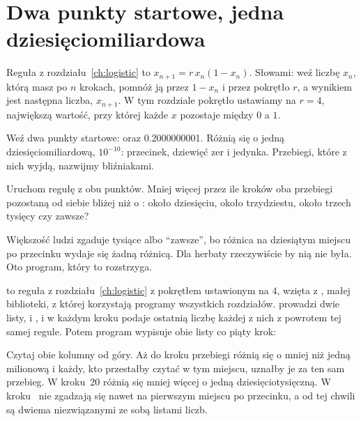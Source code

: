 \section{Dwa punkty startowe, jedna dziesięciomiliardowa}
\label{sec:ch06-twins}

\noindent
Reguła z rozdziału~\ref{ch:logistic} to $x_{n+1} = r\,x_n(1 - x_n)$.
Słowami: weź liczbę $x_n$, którą masz po $n$ krokach, pomnóż ją przez
$1 - x_n$ i przez pokrętło $r$, a wynikiem jest następna liczba, $x_{n+1}$.
W tym rozdziale pokrętło ustawiamy na $r = 4$, największą wartość, przy
której każde $x$ pozostaje między $0$ a $1$.

Weź dwa punkty startowe:  oraz \num{0.2000000001}. Różnią
się o jedną dziesięciomiliardową, $10^{-10}$: przecinek, dziewięć zer i
jedynka. Przebiegi, które z nich wyjdą, nazwijmy bliźniakami.

\begin{think}
Uruchom regułę z obu punktów. Mniej więcej przez ile kroków oba przebiegi
pozostaną od siebie bliżej niż o : około dziesięciu, około
trzydziestu, około trzech tysięcy czy zawsze?
\end{think}
Większość ludzi zgaduje tysiące albo \enquote{zawsze}, bo różnica na
dziesiątym miejscu po przecinku wydaje się żadną różnicą. Dla herbaty
rzeczywiście by nią nie była. Oto program, który to rozstrzyga.


\noindent
{} to reguła z rozdziału~\ref{ch:logistic} z pokrętłem
ustawionym na $4$, wzięta z , małej biblioteki, z której
korzystają programy wszystkich rozdziałów.  prowadzi dwie
listy,  i , i w każdym kroku podaje ostatnią liczbę każdej z
nich z powrotem tej samej regule. Potem program wypisuje obie listy co piąty
krok:


\noindent
Czytaj obie kolumny od góry. Aż do kroku  przebiegi
różnią się o mniej niż jedną milionową i każdy, kto przestałby czytać w tym
miejscu, uznałby je za ten sam przebieg. W kroku~20 różnią się mniej więcej
o jedną dziesięciotysięczną. W kroku~ nie zgadzają się
nawet na pierwszym miejscu po przecinku, a od tej chwili są dwiema
niezwiązanymi ze sobą listami liczb.

